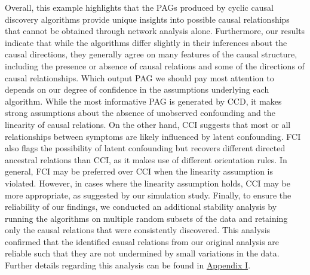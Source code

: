 \documentclass[twoside, 11pt]{article}
\begin{document}
Overall, this example highlights that the PAGs produced by cyclic causal discovery algorithms provide unique insights into possible causal relationships that cannot be obtained through network analysis alone. 
Furthermore, our results indicate that while the algorithms differ slightly in their inferences about the causal directions, they generally agree on many features of the causal structure, including the presence or absence of causal relations and some of the directions of causal relationships.
 Which output PAG we should pay most attention to depends on our degree of confidence in the assumptions underlying each algorithm. While the most informative PAG is generated by CCD, it makes strong assumptions about the absence of unobserved confounding and the linearity of causal relations. On the other hand, CCI suggests that most or all relationships between symptoms are likely influenced by latent confounding. FCI also flags the possibility of latent confounding but recovers different directed ancestral relations than CCI, as it makes use of different orientation rules. In general, FCI may be preferred over CCI when the linearity assumption is violated. However, in cases where the linearity assumption holds, CCI may be more appropriate, as suggested by our simulation study. 
Finally, to ensure the reliability of our findings, we conducted an additional stability analysis by running the algorithms on multiple random subsets of the data and retaining only the causal relations that were consistently discovered. This analysis confirmed that the identified causal relations from our original analysis are reliable such that they are not undermined by small variations in the data. Further details regarding this analysis can be found in \hyperref[stability]{Appendix I}.
\end{document}
